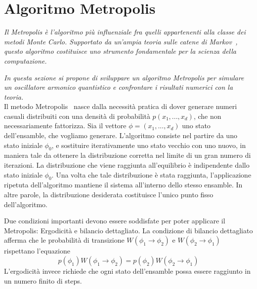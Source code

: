 \chapter{\huge Algoritmo Metropolis}

\textit{Il Metropolis è l'algoritmo più influenziale fra quelli appartenenti alla classe dei metodi Monte Carlo. Supportato da un'ampia teoria sulle catene di Markov~\cite{due}, questo algoritmo costituisce uno strumento fondamentale per la scienza della computazione.}

\textit{In questa sezione si propone di sviluppare un algoritmo Metropolis per simulare un oscillatore armonico quantistico e confrontare i risultati numerici con la teoria.}
\\

Il metodo Metropolis~\cite{quattro} nasce dalla necessità pratica di dover generare numeri casuali distribuiti con una densità di probabilità $p(x_1,...,x_d)$, che non necessariamente fattorizza. Sia il vettore $\phi = (x_1,...,x_d)$ uno stato dell'ensamble, che vogliamo generare. L'algoritmo consiste nel partire da uno stato iniziale $\phi_0$, e sostituire iterativamente uno stato vecchio con uno nuovo, in maniera tale da ottenere la distribuzione corretta nel limite di un gran numero di iterazioni. La distribuzione che viene raggiunta all'equilibrio è indipendente dallo stato iniziale $\phi_0$. Una volta che tale distribuzione è stata raggiunta, l'applicazione ripetuta dell'algoritmo mantiene il sistema all'interno dello stesso ensamble. In altre parole, la distribuzione desiderata costituisce l'unico punto fisso dell'algoritmo.

Due condizioni importanti devono essere soddisfate per poter applicare il Metropolis: Ergodicità e bilancio dettagliato. La condizione di bilancio dettagliato afferma che le probabilità di transizione $W(\phi_1\rightarrow\phi_2)$ e $W(\phi_2\rightarrow\phi_1)$ rispettano l'equazione $$p(\phi_1)W(\phi_1\rightarrow\phi_2) = p(\phi_2)W(\phi_2\rightarrow\phi_1)$$
L'ergodicità invece richiede che ogni stato dell'ensamble possa essere raggiunto in un numero finito di steps.

